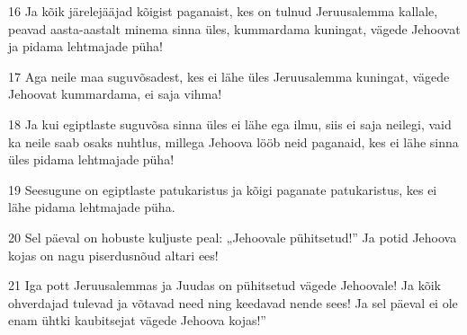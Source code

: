 \par 16 Ja kõik järelejääjad kõigist paganaist, kes on tulnud Jeruusalemma kallale, peavad aasta-aastalt minema sinna üles, kummardama kuningat, vägede Jehoovat ja pidama lehtmajade püha!
\par 17 Aga neile maa suguvõsadest, kes ei lähe üles Jeruusalemma kuningat, vägede Jehoovat kummardama, ei saja vihma!
\par 18 Ja kui egiptlaste suguvõsa sinna üles ei lähe ega ilmu, siis ei saja neilegi, vaid ka neile saab osaks nuhtlus, millega Jehoova lööb neid paganaid, kes ei lähe sinna üles pidama lehtmajade püha!
\par 19 Seesugune on egiptlaste patukaristus ja kõigi paganate patukaristus, kes ei lähe pidama lehtmajade püha.
\par 20 Sel päeval on hobuste kuljuste peal: „Jehoovale pühitsetud!” Ja potid Jehoova kojas on nagu piserdusnõud altari ees!
\par 21 Iga pott Jeruusalemmas ja Juudas on pühitsetud vägede Jehoovale! Ja kõik ohverdajad tulevad ja võtavad need ning keedavad nende sees! Ja sel päeval ei ole enam ühtki kaubitsejat vägede Jehoova kojas!”





